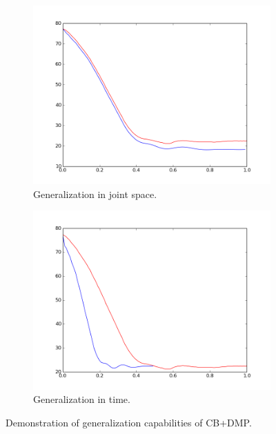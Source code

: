 \documentclass[a4paper]{article}
\begin{document}
 
\begin{figure}
\centering
\begin{subfigure}{.5\textwidth}
  \centering
  \includegraphics[width=.8\linewidth]{cb_dmp3.png}
  \caption{Generalization in joint space.}
  \label{fig:cbdmp3}
\end{subfigure}%
\begin{subfigure}{.5\textwidth}
  \centering
  \includegraphics[width=.8\linewidth]{cb_dmp4.png}
  \caption{Generalization in time.}
  \label{fig:cbdmp4}
\end{subfigure}
\caption{Demonstration of generalization capabilities of CB+DMP.}
\label{fig:ubot_gen}
\end{figure}

$$$$$$$$
\end{document}
